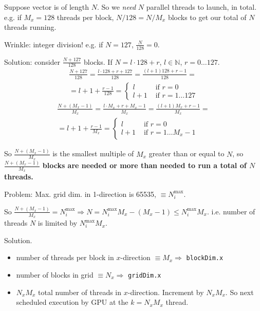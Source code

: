 \documentclass[10pt]{amsart}
\begin{document}
\begin{multicols*}{2}
 
 Suppose vector is of length $N$.  So we \emph{need} $N$ parallel threads to launch, in total. \\
 e.g. if $M_x = 128$ threads per block, $N/128 = N/M_x$ blocks to get our total of $N$ threads running.

 Wrinkle: integer division!  e.g. if $N=127 $, $\frac{N}{128} = 0$.

 Solution: consider $\frac{N+127}{128}$ blocks.  If $N = l\cdot 128 + r$, $l\in \mathbb{N}$, $r = 0 \dots 127$.
 \[
 \begin{gathered}
   \frac{N+127}{128} = \frac{ l \cdot 128 + r + 127 }{128} = \frac{ (l+1)128 + r- 1}{128} = \\
   = l+1 + \frac{r-1}{128} = \begin{cases}
     l & \text{ if } r= 0 \\
     l+1 & \text{ if } r = 1 \dots 127
     \end{cases}
 \end{gathered}
 \]
 \[
 \begin{gathered}
   \frac{ N + (M_x - 1) }{M_x} = \frac{ l\cdot M_x + r+ M_x - 1}{M_x} = \frac{ (l+1)M_x + r-1 }{M_x} = \\
   = l+1 + \frac{r-1}{M_x} = \begin{cases}
     l & \text{ if } r = 0 \\
     l +1 & \text{ if } r = 1 \dots M_x -1 
     \end{cases}
 \end{gathered}
 \]
 
 So $\frac{N+(M_x-1)}{M_x}$ is the smallest multiple of $M_x$ greater than or equal to $N$, so $\frac{N + (M_x- 1)}{M_x}$ \textbf{blocks are needed or more than needed to run a total of $N$ threads.}

 
 Problem: Max. grid dim. in 1-direction is 65535, $\equiv N_i^{\text{max}}$.

 So $\frac{ N+ (M_x-1)}{M_x} = N_i^{\text{max}} \Longrightarrow N = N_i^{\text{max}} M_x - (M_x-1) \leq N_i^{\text{max}} M_x$.  i.e. number of threads $N$ is limited by $N_i^{\text{max}} M_x$.

 Solution.

 \begin{itemize}
 \item number of threads per block in $x$-direction $\equiv M_x \Longrightarrow $ \verb|blockDim.x| \\
 \item number of blocks in grid $\equiv N_x \Longrightarrow $ \verb|gridDim.x| 
 \item $N_x M_x$ total number of threads in $x$-direction.  Increment by $N_xM_x$.  So next scheduled execution by GPU at the $k= N_xM_x$ thread.  
   \end{itemize}


\end{multicols*}
\end{document}
